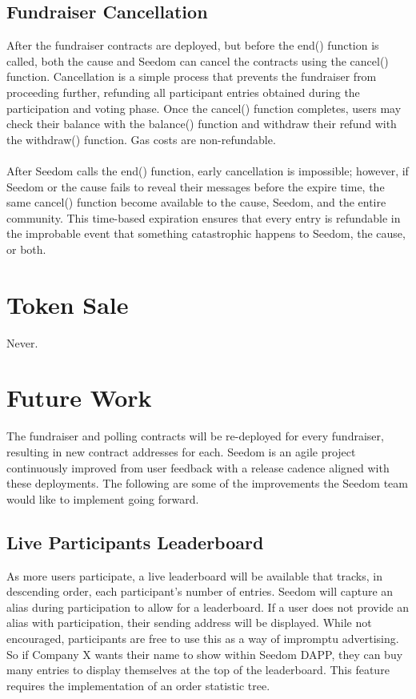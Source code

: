 \documentclass[11pt]{article}
\begin{document}
\subsection{Fundraiser Cancellation}
\label{sec:fundraiserCancellation}

After the fundraiser contracts are deployed, but before the end() function is called, both the cause and Seedom can cancel the contracts using the cancel() function. Cancellation is a simple process that prevents the fundraiser from proceeding further, refunding all participant entries obtained during the participation and voting phase. Once the cancel() function completes, users may check their balance with the balance() function and withdraw their refund with the withdraw() function. Gas costs are non-refundable.\\\\
After Seedom calls the end() function, early cancellation is impossible; however, if Seedom or the cause fails to reveal their messages before the expire time, the same cancel() function become available to the cause, Seedom, and the entire community. This time-based expiration ensures that every entry is refundable in the improbable event that something catastrophic happens to Seedom, the cause, or both.

\section{Token Sale}
Never.

\section{Future Work}

The fundraiser and polling contracts will be re-deployed for every fundraiser, resulting in new contract addresses for each. Seedom is an agile project continuously improved from user feedback with a release cadence aligned with these deployments. The following are some of the improvements the Seedom team would like to implement going forward.

\subsection{Live Participants Leaderboard}
\label{sec:liveParticipantsLeaderboard}

As more users participate, a live leaderboard will be available that tracks, in descending order, each participant's number of entries. Seedom will capture an alias during participation to allow for a leaderboard. If a user does not provide an alias with participation, their sending address will be displayed. While not encouraged, participants are free to use this as a way of impromptu advertising. So if Company X wants their name to show within Seedom DAPP, they can buy many entries to display themselves at the top of the leaderboard. This feature requires the implementation of an order statistic tree.
\end{document}

